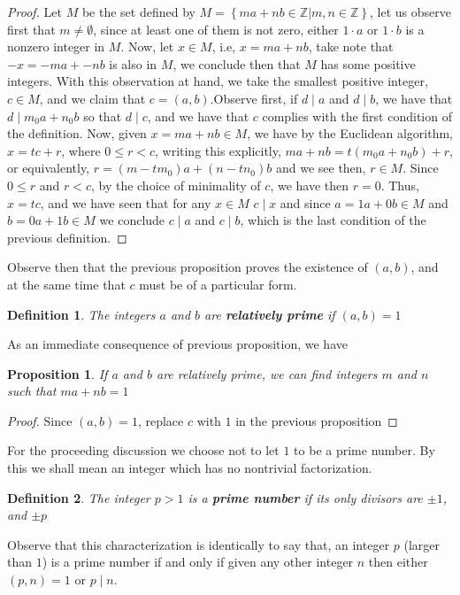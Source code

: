 \documentclass[11pt,a4paper]{article}
\newtheorem{define}{Definition}
\newtheorem{claim}{Proposition}
\begin{document}
\begin{proof}	
	Let $M$ be the set defined by $M = \left\lbrace ma + nb \in \mathbb{Z} \vert m,n \in \mathbb{Z} \right\rbrace $, let us observe first that $ m \neq \emptyset $, since at least one of them is not zero, either $ 1\cdot a$ or $1 \cdot b$ is a nonzero integer in $M$. Now, let $x \in M$, i.e, $ x = ma +nb$, take note that $ -x = -ma + -nb$ is also in $M$, we conclude then that $M$ has some positive integers. With this observation at hand, we take the smallest positive integer, $c \in M$, and we claim that $ c = (a,b)$.Observe first, if $ d \mid a$ and $ d \mid b$, we have that $ d \mid m_0a + n_0b$ so that $ d \mid c$, and we have that $c$ complies with the first condition of the definition. Now, given $x = ma + nb \in M$, we have by the Euclidean algorithm, $ x = tc + r$, where $ 0 \leq r < c $, writing this explicitly, $ ma + nb = t(m_0a + n_0b) + r$, or equivalently, $ r = (m- tm_0)a + (n - tn_0)b$ and we see then, $r \in M$. Since $ 0 \leq r$ and $ r < c$, by the choice of minimality of $c$, we have then $ r = 0 $. Thus, $ x =tc$, and we have seen that for any $ x \in M$ $ c \mid x$ and since $ a = 1a + 0b \in M$ and $ b = 0a + 1b \in M$ we conclude $ c \mid a $ and $ c \mid b$, which is the last condition of the previous definition.
\end{proof}
Observe then that the previous proposition proves the existence of $(a,b)$, and at the same time that $c$ must be of a particular form.
\begin{define}
	The integers $a$ and $b$ are \textbf{relatively prime} if $(a,b) = 1$
\end{define}
As an immediate consequence of previous proposition, we have
\begin{claim}
	If $a$ and $b$ are relatively prime, we can find integers $m$ and $n$ such that $ma + nb = 1$
\end{claim}
\begin{proof}
	Since $(a,b) = 1$, replace $c$ with $1$ in the previous proposition
\end{proof}
For the proceeding discussion we choose not to let $1$ to be a prime number. By this we shall mean an integer which has no nontrivial factorization.
\begin{define}
	The integer $ p > 1$ is a \textbf{prime number} if its only divisors are $ \pm 1 $, and $ \pm p$
\end{define} 
Observe that this characterization is identically to say that, an integer $p$ (larger than $1$) is a prime number if and only if given any other integer $n$ then either $(p,n) = 1$ or $ p \mid n$.
\end{document}
